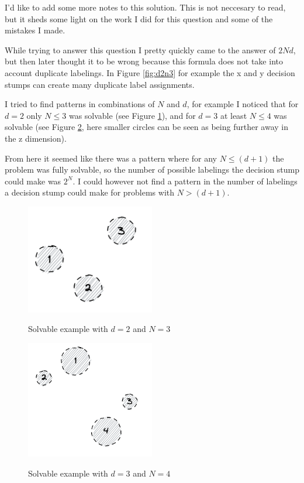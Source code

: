 \documentclass[11pt,a4paper]{article}
\begin{document}
I'd like to add some more notes to this solution. This is not neccesary to read, but it sheds some light on the work I did for this question and some of the mistakes I made. 

While trying to answer this question I pretty quickly came to the answer of $2Nd$, but then later thought it to be wrong because this formula does not take into account duplicate labelings. In Figure \ref{fig:d2n3} for example the x and y decision stumps can create many duplicate label assignments. 

I tried to find patterns in combinations of $N$ and $d$, for example I noticed that for $d=2$ only $N \leq 3$ was solvable (see Figure \ref{fig:d2n3_solvable}), and for $d=3$ at least $N \leq 4$ was solvable (see Figure \ref{fig:d3n4_solvable}, here smaller circles can be seen as being further away in the z dimension). 

From here it seemed like there was a pattern where for any $N \leq (d+1)$ the problem was fully solvable, so the number of possible labelings the decision stump could make was $2^N$. I could however not find a pattern in the number of labelings a decision stump could make for problems with $N > (d+1)$.

\begin{figure}[h]
    \caption{Solvable example with $d=2$ and $N=3$}
    \centering
    \includegraphics[width=0.5\textwidth]{d2n3_solvable.png}
    \label{fig:d2n3_solvable}
\end{figure}

\begin{figure}[h]
    \caption{Solvable example with $d=3$ and $N=4$}
    \centering
    \includegraphics[width=0.5\textwidth]{d3n4_solvable.png}
    \label{fig:d3n4_solvable}
\end{figure}
\end{document}

